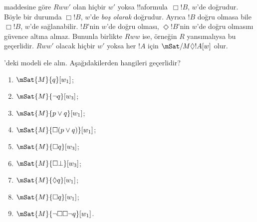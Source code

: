  maddesine göre $Rww'$ olan hiçbir $w'$ yoksa
!!a{formula}~$\Box !B$, $w$'de doğrudur. Böyle bir durumda $\Box !B$,
$w$'de \emph{boş olarak} doğrudur. Ayrıca $!B$ doğru olmasa bile
$\Box !B$, $w$'de sağlanabilir. $!B$'nin $w$'de doğru olması,
$\Diamond !B$'nin $w$'de doğru olmasını güvence altına almaz. Bununla
birlikte $Rww$ ise, örneğin $R$ yansımalıysa bu geçerlidir. $Rww'$ olacak
hiçbir $w'$ yoksa her $!A$ için $\mSat/{M}{\Diamond !A}[w]$ olur.

\begin{prob}
  'deki modeli ele alın. Aşağıdakilerden
  hangileri geçerlidir?
    \begin{enumerate}
    \item $\mSat{M}{q}[w_1]$;
    \item $\mSat{M}{\lnot q}[w_3]$;
    \item $\mSat{M}{p \lor q}[w_1]$;
    \item $\mSat{M}{\Box (p \lor q)}[w_1]$;
    \item $\mSat{M}{\Box q}[w_3]$;
    \item $\mSat{M}{\Box \bot}[w_3]$;
    \item $\mSat{M}{\Diamond q}[w_1]$;
    \item $\mSat{M}{\Box q}[w_1]$;
    \item $\mSat{M}{\lnot \Box\Box \lnot q}[w_1]$.
    \end{enumerate}
\end{prob}

